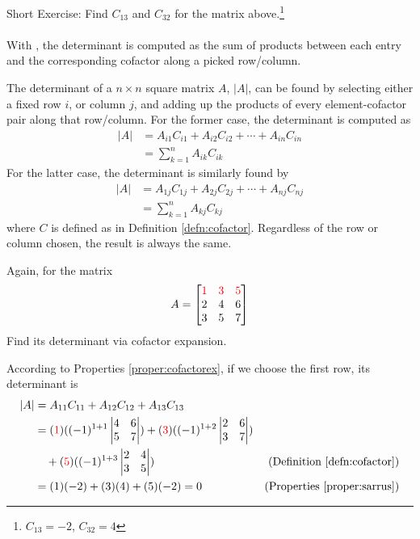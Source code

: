 Short Exercise: Find $C_{13}$ and $C_{32}$ for the matrix above.\footnote{$C_{13} = -2$, $C_{32} = 4$}\\
\\
With , the determinant is computed as the sum of products between each entry and the corresponding cofactor along a picked row/column.
\begin{proper}
\label{proper:cofactorex}
The determinant of a $n \times n$ square matrix $A$, $|A|$, can be found by selecting either a fixed row $i$, or column $j$, and adding up the products of every element-cofactor pair along that row/column. For the former case, the determinant is computed as
\begin{align*}
|A| &= A_{i1}C_{i1} + A_{i2}C_{i2} + \cdots + A_{in}C_{in} \\
&= \sum_{k=1}^{n} A_{ik}C_{ik}
\end{align*}
For the latter case, the determinant is similarly found by
\begin{align*}
|A| &= A_{1j}C_{1j} + A_{2j}C_{2j} + \cdots + A_{nj}C_{nj} \\
&= \sum_{k=1}^{n} A_{kj}C_{kj}
\end{align*}
where $C$ is defined as in Definition \ref{defn:cofactor}. Regardless of the row or column chosen, the result is always the same.
\end{proper}
\begin{exmp}
Again, for the matrix
\begin{align*}
A =
\begin{bmatrix}
\textcolor{red}{1} & \textcolor{red}{3} & \textcolor{red}{5} \\
2 & 4 & 6 \\
3 & 5 & 7 
\end{bmatrix}   
\end{align*}
Find its determinant via cofactor expansion.
\end{exmp}
\begin{solution}
According to Properties \ref{proper:cofactorex}, if we choose the first row, its determinant is
\begin{align*}
|A| &= A_{11}C_{11} + A_{12}C_{12} + A_{13}C_{13} \\
&= 
(\textcolor{red}{1})((-1)^{1+1}
\begin{vmatrix}
4 & 6 \\
5 & 7
\end{vmatrix})
+
(\textcolor{red}{3})((-1)^{1+2}
\begin{vmatrix}
2 & 6 \\
3 & 7
\end{vmatrix}) \\
&\quad+ 
(\textcolor{red}{5})((-1)^{1+3}
\begin{vmatrix}
2 & 4 \\
3 & 5
\end{vmatrix}) & \text{(Definition \ref{defn:cofactor})}\\
&= (1)(-2) + (3)(4) + (5)(-2) = 0 & \text{(Properties \ref{proper:sarrus})} 
\end{align*}
\end{solution}

